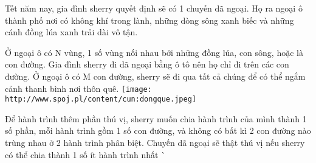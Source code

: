 Tết năm nay, gia đình sherry quyết định sẽ có 1 chuyến dã ngoại. Họ ra ngoại ô thành phố nơi có không khí trong lành, những dòng sông xanh biếc và những cánh đồng lúa xanh trải dài vô tận.  

   Ở ngoại ô có N vùng, 1 số vùng nối nhau bởi những đồng lúa, con sông, hoặc là con đường. Gia đình sherry đi dã ngoại bằng ô tô nên họ chỉ đi trên các con đường. Ở ngoại ô có M con đường, sherry sẽ đi qua tất cả chúng để có thể ngắm cảnh thanh bình nơi thôn quê.  
\texttt{[image: http://www.spoj.pl/content/cun:dongque.jpeg]}

   Để hành trình thêm phần thú vị, sherry muốn chia hành trình của mình thành 1 số phần, mỗi hành trình gồm 1 số con đường, và không có bất kì 2 con đường nào trùng nhau ở 2 hành trình phân biệt. Chuyến dã ngoại sẽ thật thú vị nếu sherry có thể chia thành 1 số ít hành trình nhất ^^  

\